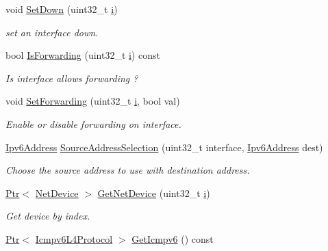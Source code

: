 \begin{DoxyCompactItemize}
void \hyperlink{classns3_1_1Ipv6L3Protocol_aac61d62990fdfa91000cffe7fd918062}{Set\+Down} (uint32\+\_\+t \hyperlink{lte__uplink__power__control_8m_a6f6ccfcf58b31cb6412107d9d5281426}{i})
\begin{DoxyCompactList}\small\item\em set an interface down. \end{DoxyCompactList}\item 
bool \hyperlink{classns3_1_1Ipv6L3Protocol_adae9c781382073a1db0429a4f156dee2}{Is\+Forwarding} (uint32\+\_\+t \hyperlink{lte__uplink__power__control_8m_a6f6ccfcf58b31cb6412107d9d5281426}{i}) const 
\begin{DoxyCompactList}\small\item\em Is interface allows forwarding ? \end{DoxyCompactList}\item 
void \hyperlink{classns3_1_1Ipv6L3Protocol_a1a8bef4362f31f4f2b32ea6e7051467a}{Set\+Forwarding} (uint32\+\_\+t \hyperlink{lte__uplink__power__control_8m_a6f6ccfcf58b31cb6412107d9d5281426}{i}, bool val)
\begin{DoxyCompactList}\small\item\em Enable or disable forwarding on interface. \end{DoxyCompactList}\item 
\hyperlink{classns3_1_1Ipv6Address}{Ipv6\+Address} \hyperlink{classns3_1_1Ipv6L3Protocol_a77acb50e395f36951381977368ebc5cb}{Source\+Address\+Selection} (uint32\+\_\+t interface, \hyperlink{classns3_1_1Ipv6Address}{Ipv6\+Address} dest)
\begin{DoxyCompactList}\small\item\em Choose the source address to use with destination address. \end{DoxyCompactList}\item 
\hyperlink{classns3_1_1Ptr}{Ptr}$<$ \hyperlink{classns3_1_1NetDevice}{Net\+Device} $>$ \hyperlink{classns3_1_1Ipv6L3Protocol_a574d1beafc86062acf582e75dc437a47}{Get\+Net\+Device} (uint32\+\_\+t \hyperlink{lte__uplink__power__control_8m_a6f6ccfcf58b31cb6412107d9d5281426}{i})
\begin{DoxyCompactList}\small\item\em Get device by index. \end{DoxyCompactList}\item 
\hyperlink{classns3_1_1Ptr}{Ptr}$<$ \hyperlink{classns3_1_1Icmpv6L4Protocol}{Icmpv6\+L4\+Protocol} $>$ \hyperlink{classns3_1_1Ipv6L3Protocol_a10384a4dc85c61e65cf73b47ec9da90d}{Get\+Icmpv6} () const 

\end{DoxyCompactItemize}
